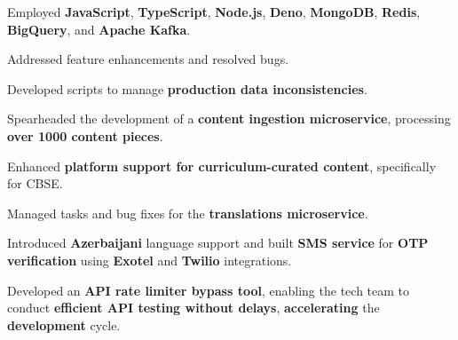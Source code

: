 \documentclass[]{deedy-resume-openfont}
\begin{document}
\begin{minipage}[t]{0.66\textwidth}
\sectionsep
\begin{tightemize}
\item Employed \textbf{JavaScript}, \textbf{TypeScript}, \textbf{Node.js}, \textbf{Deno}, \textbf{MongoDB}, \textbf{Redis}, \textbf{BigQuery}, and \textbf{Apache Kafka}.
\item Addressed feature enhancements and resolved bugs.
\item Developed scripts to manage \textbf{production data inconsistencies}.
\item Spearheaded the development of a \textbf{content ingestion microservice}, processing \textbf{over 1000 content pieces}.
\item Enhanced \textbf{platform support for curriculum-curated content}, specifically for CBSE.
\item Managed tasks and bug fixes for the \textbf{translations microservice}.
\item Introduced \textbf{Azerbaijani} language support and built \textbf{SMS service} for \textbf{OTP verification} using \textbf{Exotel} and \textbf{Twilio} integrations.
\item Developed an \textbf{API rate limiter bypass tool}, enabling the tech team to conduct \textbf{efficient API testing without delays}, \textbf{accelerating} the \textbf{development} cycle.
\end{tightemize}
\sectionsep


\end{minipage}
\end{document}
